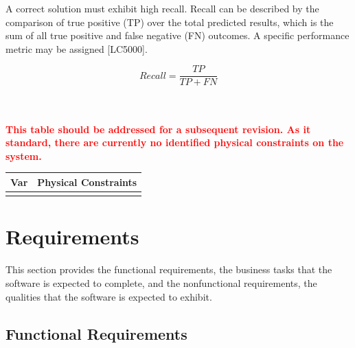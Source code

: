 \documentclass[12pt]{article}
\begin{document}
\noindent
A correct solution must exhibit high recall. Recall can be described by the comparison of true positive (TP) over the 
total predicted results, which is the sum of all true positive and false negative (FN) outcomes. A specific performance metric 
may be assigned [LC5000].

$$Recall = \frac{TP}{TP + FN}$$



\noindent
\\
\\
\textcolor{red}{\textbf{This table should be addressed for a subsequent revision. As it standard, there are currently no 
identified physical constraints on the system.}}
\begin{table}[!h]
\caption{Output Variables} \label{TblOutputVar}
\renewcommand{\arraystretch}{1.2}
\noindent \begin{longtable*}{l l} 
  \toprule
  \textbf{Var} & \textbf{Physical Constraints} \\
  \midrule 

  \\
  \bottomrule
\end{longtable*}
\end{table}

\section{Requirements}
This section provides the functional requirements, the business tasks that the
software is expected to complete, and the nonfunctional requirements, the
qualities that the software is expected to exhibit.

\newpage
\subsection{Functional Requirements}
\end{document}
